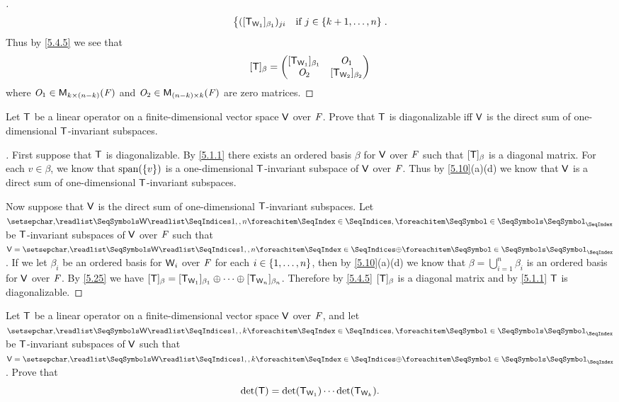 \begin{proof}[]
\begin{align*}
\begin{dcases}
			                                  ([\mathsf{T}_{\mathsf{W}_1}]_{\beta_1})_{j i} & \text{if } j \in \left\lbrace k + 1, \dots, n\right\rbrace
		                                  \end{dcases}.
	\end{align*}
	Thus by \cref{5.4.5} we see that
	\[
		[\mathsf{T}]_{\beta} = \begin{pmatrix}
			[\mathsf{T}_{\mathsf{W}_1}]_{\beta_1} & \mathit{O}_1                 \\
			\mathit{O}_2                 & [\mathsf{T}_{\mathsf{W}_2}]_{\beta_2}
		\end{pmatrix}
	\]
	where \(\zm_1 \in \ms[k][(n - k)][\F]\) and \(\zm_2 \in \ms[(n - k)][k][\F]\) are zero matrices.
\end{proof}

\setcounter{ex}{35}
\begin{ex}\label{ex:5.4.36}
	Let \(\mathsf{T}\) be a linear operator on a finite-dimensional vector space \(\mathsf{V}\) over \(\mathit{F}\).
	Prove that \(\mathsf{T}\) is diagonalizable iff \(\mathsf{V}\) is the direct sum of one-dimensional \(\mathsf{T}\)-invariant subspaces.
\end{ex}

\begin{proof}[]
	First suppose that \(\mathsf{T}\) is diagonalizable.
	By \cref{5.1.1} there exists an ordered basis \(\beta\) for \(\mathsf{V}\) over \(\mathit{F}\) such that \([\mathsf{T}]_{\beta}\) is a diagonal matrix.
	For each \(v \in \beta\), we know that \(\spn{\set{v}}\) is a one-dimensional \(\mathsf{T}\)-invariant subspace of \(\mathsf{V}\) over \(\mathit{F}\).
	Thus by \cref{5.10}(a)(d) we know that \(\mathsf{V}\) is a direct sum of one-dimensional \(\mathsf{T}\)-invariant subspaces.

	Now suppose that \(\mathsf{V}\) is the direct sum of one-dimensional \(\mathsf{T}\)-invariant subspaces.
	Let \(\seq{\W}{1,,n}\) be \(\mathsf{T}\)-invariant subspaces of \(\mathsf{V}\) over \(\mathit{F}\) such that \(\V = \seq[\oplus]{\W}{1,,n}\).
	If we let \(\beta_i\) be an ordered basis for \(\mathsf{W}_i\) over \(\mathit{F}\) for each \(i \in \left\lbrace1, \dots, n\right\rbrace\), then by \cref{5.10}(a)(d) we know that \(\beta = \bigcup_{i = 1}^n \beta_i\) is an ordered basis for \(\mathsf{V}\) over \(\mathit{F}\).
	By \cref{5.25} we have \([\mathsf{T}]_{\beta} = [\mathsf{T}_{\mathsf{W}_1}]_{\beta_1} \oplus \cdots \oplus [\mathsf{T}_{\mathsf{W}_n}]_{\beta_n}\).
	Therefore by \cref{5.4.5} \([\mathsf{T}]_{\beta}\) is a diagonal matrix and by \cref{5.1.1} \(\mathsf{T}\) is diagonalizable.
\end{proof}

\begin{ex}\label{ex:5.4.37}
	Let \(\mathsf{T}\) be a linear operator on a finite-dimensional vector space \(\mathsf{V}\) over \(\mathit{F}\), and let \(\seq{\W}{1,,k}\) be \(\mathsf{T}\)-invariant subspaces of \(\mathsf{V}\) such that \(\V = \seq[\oplus]{\W}{1,,k}\).
	Prove that
	\[
		\det(\mathsf{T}) = \det(\mathsf{T}_{\mathsf{W}_1}) \cdots \det(\mathsf{T}_{\mathsf{W}_k}).
	\]
\end{ex}


